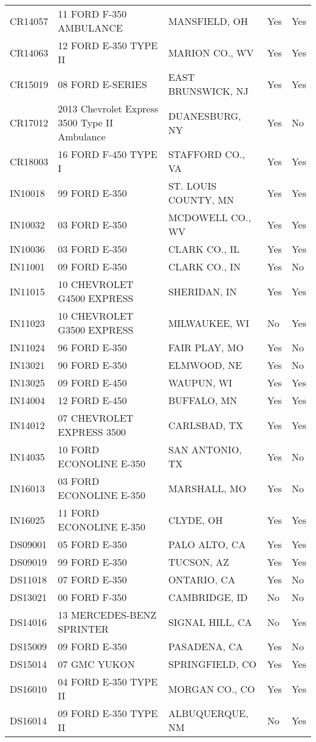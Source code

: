 \begin{appendices}
\begin{table}[]
\begin{tabular}{lllll}
CR14057 & 11 FORD F-350   AMBULANCE & MANSFIELD, OH & Yes & Yes \\
CR14063 & 12 FORD E-350 TYPE II & MARION CO., WV & Yes & Yes \\
CR15019 & 08 FORD E-SERIES & EAST BRUNSWICK, NJ & Yes & Yes \\
CR17012 & 2013 Chevrolet   Express 3500 Type II Ambulance & DUANESBURG, NY & Yes & No \\
CR18003 & 16 FORD F-450 TYPE I & STAFFORD CO., VA & Yes & Yes \\
IN10018 & 99 FORD E-350 & ST. LOUIS COUNTY, MN & Yes & Yes \\
IN10032 & 03 FORD E-350 & MCDOWELL CO., WV & Yes & Yes \\
IN10036 & 03 FORD E-350 & CLARK CO., IL & Yes & Yes \\
IN11001 & 09 FORD E-350 & CLARK CO., IN & Yes & No \\
IN11015 & 10 CHEVROLET G4500   EXPRESS & SHERIDAN, IN & Yes & Yes \\
IN11023 & 10 CHEVROLET G3500   EXPRESS & MILWAUKEE, WI & No & Yes \\
IN11024 & 96 FORD E-350 & FAIR PLAY, MO & Yes & No \\
IN13021 & 90 FORD E-350 & ELMWOOD, NE & Yes & No \\
IN13025 & 09 FORD E-450 & WAUPUN, WI & Yes & Yes \\
IN14004 & 12 FORD E-450 & BUFFALO, MN & Yes & Yes \\
IN14012 & 07 CHEVROLET EXPRESS   3500 & CARLSBAD, TX & Yes & Yes \\
IN14035 & 10 FORD ECONOLINE   E-350 & SAN ANTONIO, TX & Yes & No \\
IN16013 & 03 FORD ECONOLINE   E-350 & MARSHALL, MO & Yes & No \\
IN16025 & 11 FORD ECONOLINE   E-350 & CLYDE, OH & Yes & Yes \\
DS09001 & 05 FORD E-350 & PALO ALTO, CA & Yes & Yes \\
DS09019 & 99 FORD E-350 & TUCSON, AZ & Yes & Yes \\
DS11018 & 07 FORD E-350 & ONTARIO, CA & Yes & No \\
DS13021 & 00 FORD F-350 & CAMBRIDGE, ID & No & No \\
DS14016 & 13 MERCEDES-BENZ   SPRINTER & SIGNAL HILL, CA & No & Yes \\
DS15009 & 09 FORD E-350 & PASADENA, CA & Yes & No \\
DS15014 & 07 GMC YUKON & SPRINGFIELD, CO & Yes & Yes \\
DS16010 & 04 FORD E-350 TYPE II & MORGAN CO., CO & Yes & Yes \\
DS16014 & 09 FORD E-350 TYPE II & ALBUQUERQUE, NM & No & Yes
\end{tabular}
\end{table}


\end{appendices}
